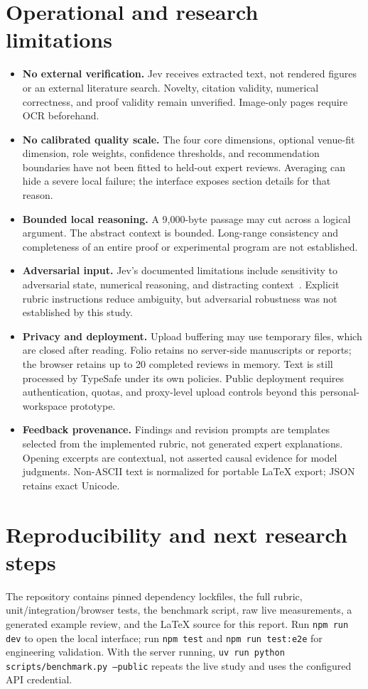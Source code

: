 \documentclass[11pt]{article}
\newcommand{\code}[1]{\texttt{#1}}
\begin{document}
\section{Operational and research limitations}
\begin{itemize}
\item \textbf{No external verification.} Jev receives extracted text, not rendered figures or an external literature search. Novelty, citation validity, numerical correctness, and proof validity remain unverified. Image-only pages require OCR beforehand.
\item \textbf{No calibrated quality scale.} The four core dimensions, optional venue-fit dimension, role weights, confidence thresholds, and recommendation boundaries have not been fitted to held-out expert reviews. Averaging can hide a severe local failure; the interface exposes section details for that reason.
\item \textbf{Bounded local reasoning.} A 9,000-byte passage may cut across a logical argument. The abstract context is bounded. Long-range consistency and completeness of an entire proof or experimental program are not established.
\item \textbf{Adversarial input.} Jev's documented limitations include sensitivity to adversarial state, numerical reasoning, and distracting context~\cite{jaggedness}. Explicit rubric instructions reduce ambiguity, but adversarial robustness was not established by this study.
\item \textbf{Privacy and deployment.} Upload buffering may use temporary files, which are closed after reading. Folio retains no server-side manuscripts or reports; the browser retains up to 20 completed reviews in memory. Text is still processed by TypeSafe under its own policies. Public deployment requires authentication, quotas, and proxy-level upload controls beyond this personal-workspace prototype.
\item \textbf{Feedback provenance.} Findings and revision prompts are templates selected from the implemented rubric, not generated expert explanations. Opening excerpts are contextual, not asserted causal evidence for model judgments. Non-ASCII text is normalized for portable LaTeX export; JSON retains exact Unicode.
\end{itemize}

\section{Reproducibility and next research steps}
The repository contains pinned dependency lockfiles, the full rubric, unit/integration/browser tests, the benchmark script, raw live measurements, a generated example review, and the LaTeX source for this report. Run \code{npm run dev} to open the local interface; run \code{npm test} and \code{npm run test:e2e} for engineering validation. With the server running, \code{uv run python scripts/benchmark.py --public} repeats the live study and uses the configured API credential.
\end{document}
